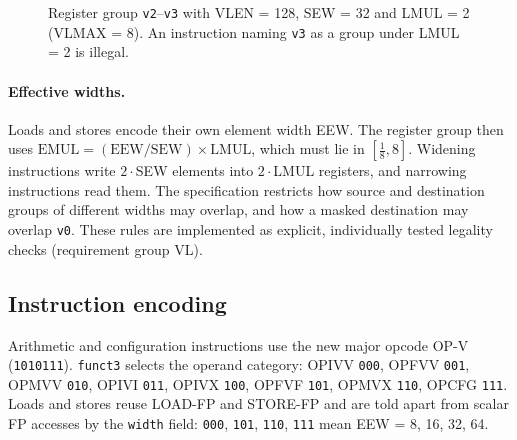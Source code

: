 \documentclass[11pt]{article}
\begin{document}
\begin{figure}[htbp]
\centering
{}
\caption{Register group \texttt{v2}--\texttt{v3} with VLEN = 128, SEW = 32 and LMUL = 2
(VLMAX = 8). An instruction naming \texttt{v3} as a group under LMUL = 2 is illegal.}\label{fig:group}
\end{figure}

\paragraph{Effective widths.} Loads and stores encode their own element width EEW. The register
group then uses $\mathrm{EMUL} = (\mathrm{EEW}/\mathrm{SEW})\times\mathrm{LMUL}$, which must lie in
$[\tfrac18, 8]$. Widening instructions write $2\cdot$SEW elements into $2\cdot$LMUL registers, and
narrowing instructions read them. The specification restricts how source and destination groups of
different widths may overlap, and how a masked destination may overlap \texttt{v0}. These rules are
implemented as explicit, individually tested legality checks (requirement group VL).

\subsection{Instruction encoding}

Arithmetic and configuration instructions use the new major opcode OP-V (\texttt{1010111}).
\texttt{funct3} selects the operand category: OPIVV \texttt{000}, OPFVV \texttt{001}, OPMVV
\texttt{010}, OPIVI \texttt{011}, OPIVX \texttt{100}, OPFVF \texttt{101}, OPMVX \texttt{110},
OPCFG \texttt{111}. Loads and stores reuse LOAD-FP and STORE-FP and are told apart from scalar FP
accesses by the \texttt{width} field: \texttt{000}, \texttt{101}, \texttt{110}, \texttt{111} mean
EEW = 8, 16, 32, 64.
\end{document}
